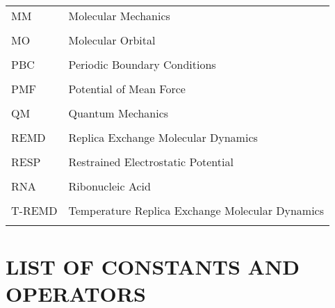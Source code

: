 \begin{tabular}{lp{5in}}
MM & Molecular Mechanics \\ \\

MO & Molecular Orbital \\ \\

PBC & Periodic Boundary Conditions \\ \\

PMF & Potential of Mean Force \\ \\

QM & Quantum Mechanics \\ \\

REMD & Replica Exchange Molecular Dynamics \\ \\

RESP & Restrained Electrostatic Potential \\ \\

RNA & Ribonucleic Acid \\ \\

T-REMD & Temperature Replica Exchange Molecular Dynamics \\ \\

\end{tabular}

\chapter*{LIST OF CONSTANTS AND OPERATORS}

